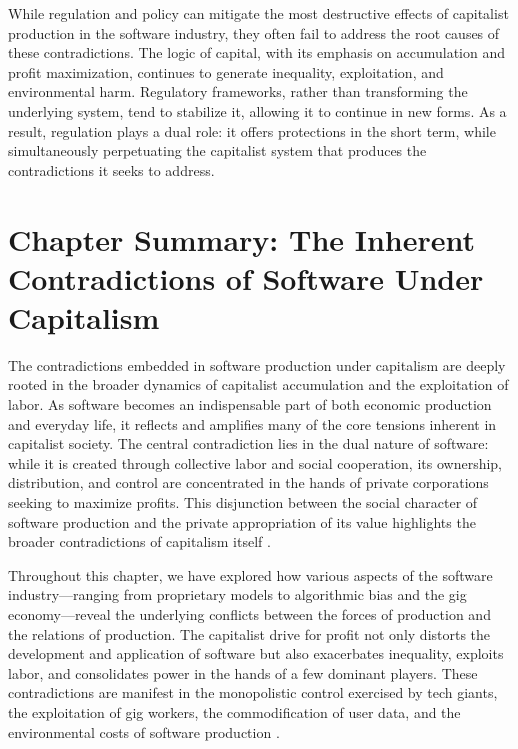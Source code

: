 \begin{refsection}
While regulation and policy can mitigate the most destructive effects of capitalist production in the software industry, they often fail to address the root causes of these contradictions. The logic of capital, with its emphasis on accumulation and profit maximization, continues to generate inequality, exploitation, and environmental harm. Regulatory frameworks, rather than transforming the underlying system, tend to stabilize it, allowing it to continue in new forms. As a result, regulation plays a dual role: it offers protections in the short term, while simultaneously perpetuating the capitalist system that produces the contradictions it seeks to address.

\section{Chapter Summary: The Inherent Contradictions of Software Under Capitalism}

The contradictions embedded in software production under capitalism are deeply rooted in the broader dynamics of capitalist accumulation and the exploitation of labor. As software becomes an indispensable part of both economic production and everyday life, it reflects and amplifies many of the core tensions inherent in capitalist society. The central contradiction lies in the dual nature of software: while it is created through collective labor and social cooperation, its ownership, distribution, and control are concentrated in the hands of private corporations seeking to maximize profits. This disjunction between the social character of software production and the private appropriation of its value highlights the broader contradictions of capitalism itself \cite[pp.~382-384]{marx1976}.

Throughout this chapter, we have explored how various aspects of the software industry—ranging from proprietary models to algorithmic bias and the gig economy—reveal the underlying conflicts between the forces of production and the relations of production. The capitalist drive for profit not only distorts the development and application of software but also exacerbates inequality, exploits labor, and consolidates power in the hands of a few dominant players. These contradictions are manifest in the monopolistic control exercised by tech giants, the exploitation of gig workers, the commodification of user data, and the environmental costs of software production \cite[pp.~45-47]{fuchs2015}.


\end{refsection}
